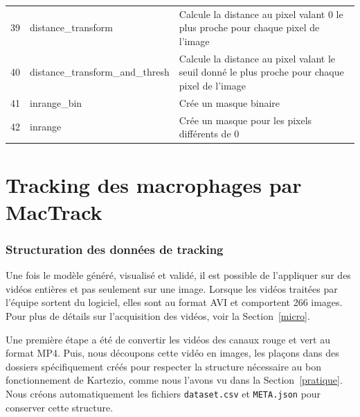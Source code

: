 \documentclass[a4paper,12pt]{report}
\begin{document}
\begin{longtable}{|c|l|P{6cm}|}
    39              & distance\_transform              & Calcule la distance au pixel valant 0 le plus proche pour chaque pixel de l'image              \\
    40              & distance\_transform\_and\_thresh & Calcule la distance au pixel valant le seuil donné le plus proche pour chaque pixel de l'image \\
    41              & inrange\_bin                     & Crée un masque binaire                                                                         \\
    42              & inrange                          & Crée un masque pour les pixels différents de 0
\end{longtable}
\setcounter{table}{0}
\label{ann:func}

\section{Tracking des macrophages par MacTrack}\label{mactrack1}



\subsubsection*{Structuration des données de tracking}


Une fois le modèle généré, visualisé et validé, il est possible de l'appliquer sur des vidéos entières et pas seulement sur une image. Lorsque les vidéos traitées par l'équipe sortent du logiciel, elles sont au format AVI et comportent 266 images. Pour plus de détails sur l'acquisition des vidéos, voir la Section~\ref{micro}.

Une première étape a été de convertir les vidéos des canaux rouge et vert au format MP4. Puis, nous découpons cette vidéo en images, les plaçons dans des dossiers spécifiquement créés pour respecter la structure nécessaire au bon fonctionnement de Kartezio, comme nous l'avons vu dans la Section~\ref{pratique}. Nous créons automatiquement les fichiers \texttt{dataset.csv} et \texttt{META.json} pour conserver cette structure.

\
\end{document}
